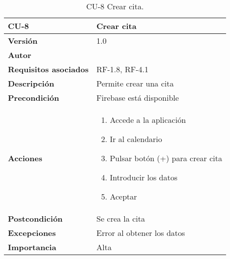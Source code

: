 \begin{table}[p]
	\centering
	\begin{tabularx}{\linewidth}{ p{} p{} }
		\toprule
		\textbf{CU-8}    & \textbf{Crear cita}\\
		\toprule
		\textbf{Versión}              & 1.0    \\
		\textbf{Autor}                & {\nombre} \\
		\textbf{Requisitos asociados} & RF-1.8, RF-4.1 \\
		\textbf{Descripción}          & Permite crear una cita\\
		\textbf{Precondición}         & Firebase está disponible \\
		\textbf{Acciones}             &
		\begin{enumerate}
			\def\labelenumi{\arabic{enumi}.}
			\tightlist
			\item Accede a la aplicación
			\item Ir al calendario
			\item Pulsar botón (+) para crear cita
			\item Introducir los datos
			\item Aceptar
		\end{enumerate}\\
		\textbf{Postcondición}        & Se crea la cita \\
		\textbf{Excepciones}          & Error al obtener los datos \\
		\textbf{Importancia}          & Alta \\
		\bottomrule
	\end{tabularx}
	\caption{CU-8 Crear cita.}
\end{table}



